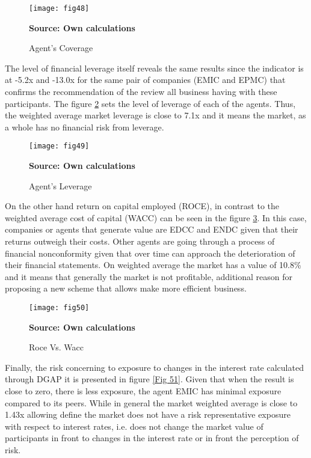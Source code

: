 \documentclass[12pt]{book}
\begin{document}
\begin{figure}  
\centering    
\texttt{[image: fig48]}  
\caption{Agent's Coverage}
\scriptsize 
\textbf{Source: Own calculations}
\captionsetup{justification=centering,margin=1cm}   
\label{Fig 48}
\end{figure}

The level of financial leverage itself reveals the same results since the indicator is at -5.2x and -13.0x for the same pair of companies (EMIC and EPMC) that confirms the recommendation of the review all business having with these participants. The figure \ref{Fig 49} sets the level of leverage of each of the agents. Thus, the weighted average market leverage is close to 7.1x and it means the market, as a whole has no financial risk from leverage.

\begin{figure}  
\centering    
\texttt{[image: fig49]}  
\caption{Agent's Leverage}
\scriptsize 
\textbf{Source: Own calculations}
\captionsetup{justification=centering,margin=1cm}   
\label{Fig 49}
\end{figure}

On the other hand return on capital employed (ROCE), in contrast to the weighted average cost of capital (WACC) can be seen in the figure \ref{Fig 50}. In this case, companies or agents that generate value are EDCC and ENDC given that their returns outweigh their costs. Other agents are going through a process of financial nonconformity given that over time can approach the deterioration of their financial statements. On weighted average the market has a value of 10.8\% and it means that generally the market is not profitable, additional reason for proposing a new scheme that allows make more efficient business.

\begin{figure}  
\centering    
\texttt{[image: fig50]}  
\caption{Roce Vs. Wacc}
\scriptsize 
\textbf{Source: Own calculations}
\captionsetup{justification=centering,margin=1cm}   
\label{Fig 50}
\end{figure}

Finally, the risk concerning to exposure to changes in the interest rate calculated through DGAP it is presented in figure \ref{Fig 51}. Given that when the result is close to zero, there is less exposure, the agent EMIC has minimal exposure compared to its peers. While in general the market weighted average is close to 1.43x allowing define the market does not have a risk representative exposure with respect to interest rates, i.e. does not change the market value of participants in front to changes in the interest rate or in front the perception of risk.
\end{document}
